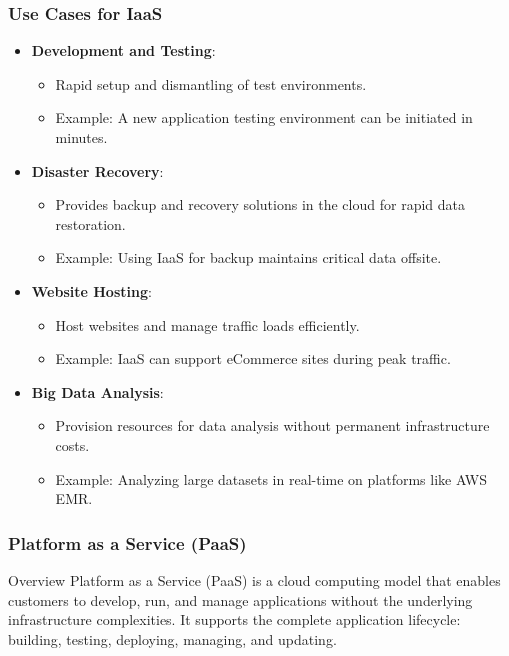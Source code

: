 \documentclass[aspectratio=169]{beamer}
\begin{document}
\begin{frame}[fragile]
    \frametitle{Use Cases for IaaS}
    \begin{itemize}
        \item \textbf{Development and Testing}:
            \begin{itemize}
                \item Rapid setup and dismantling of test environments.
                \item Example: A new application testing environment can be initiated in minutes.
            \end{itemize}
        \item \textbf{Disaster Recovery}:
            \begin{itemize}
                \item Provides backup and recovery solutions in the cloud for rapid data restoration.
                \item Example: Using IaaS for backup maintains critical data offsite.
            \end{itemize}
        \item \textbf{Website Hosting}:
            \begin{itemize}
                \item Host websites and manage traffic loads efficiently.
                \item Example: IaaS can support eCommerce sites during peak traffic.
            \end{itemize}
        \item \textbf{Big Data Analysis}:
            \begin{itemize}
                \item Provision resources for data analysis without permanent infrastructure costs.
                \item Example: Analyzing large datasets in real-time on platforms like AWS EMR.
            \end{itemize}
    \end{itemize}
\end{frame}

\begin{frame}[fragile]
    \frametitle{Platform as a Service (PaaS)}
    
    \begin{block}{Overview}
        Platform as a Service (PaaS) is a cloud computing model that enables customers to develop, run, and manage applications without the underlying infrastructure complexities. It supports the complete application lifecycle: building, testing, deploying, managing, and updating.
    \end{block}
\end{frame}
\end{document}
